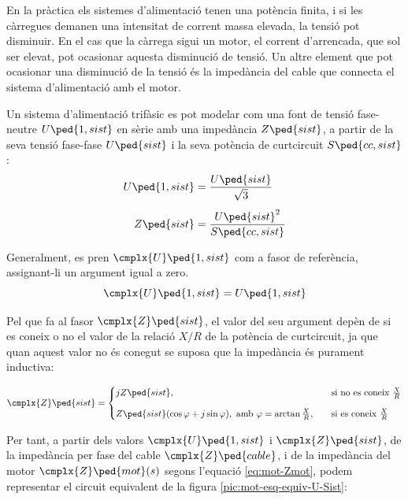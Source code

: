En la pràctica els sistemes d'alimentació tenen una potència finita, i si les càrregues demanen una intensitat de corrent massa elevada, la tensió pot disminuir. En el cas que la càrrega sigui un motor, el corrent d'arrencada, que sol ser elevat, pot ocasionar aquesta disminució de tensió. Un altre element que pot ocasionar una disminució de la tensió és la impedància del cable que connecta el sistema d'alimentació amb el motor.

Un sistema d'alimentació trifàsic es pot modelar com una font de tensió fase-neutre $U\ped{1,sist}$ en sèrie amb una impedància $Z\ped{sist}$, a partir de la seva tensió fase-fase $U\ped{sist}$ i la seva potència de curtcircuit $S\ped{cc,sist}$:
\begin{align}
	U\ped{1,sist} &= \frac{U\ped{sist}}{\sqrt{3}} \\[1ex]
	Z\ped{sist} &= \frac{U\ped{sist}^2}{S\ped{cc,sist}}
\end{align}

Generalment, es pren $\cmplx{U}\ped{1,sist}$ com a fasor de referència, assignant-li un argument igual a zero. 
\begin{equation}
	\cmplx{U}\ped{1,sist} = U\ped{1,sist}
\end{equation}

Pel que fa al fasor  $\cmplx{Z}\ped{sist}$, el valor del seu argument depèn de si es coneix o no el valor de la relació $X/R$ de la potència de curtcircuit, ja que quan aquest valor no és conegut se suposa que la impedància és purament inductiva:

\begin{equation}
	\cmplx{Z}\ped{sist} = 
	\begin{cases}
		j Z\ped{sist},  & \quad\text{si no es coneix }\frac{X}{R}  \\[2ex]
		Z\ped{sist} (\cos\varphi+j\sin\varphi), \text{ amb } \varphi=\arctan\frac{X}{R}, & \quad\text{si es coneix } \frac{X}{R} 
	\end{cases}
\end{equation}

Per tant, a partir dels valors $\cmplx{U}\ped{1,sist}$ i $\cmplx{Z}\ped{sist}$, de la impedància per fase del cable $\cmplx{Z}\ped{cable}$, i de la impedància del motor $\cmplx{Z}\ped{mot}(s)$ segons l'equació \eqref{eq:mot-Zmot}, podem representar el circuit equivalent de la figura \vref{pic:mot-esq-equiv-U-Sist}:

\begin{center}
	
	\label{pic:mot-esq-equiv-U-Sist}
\end{center}

